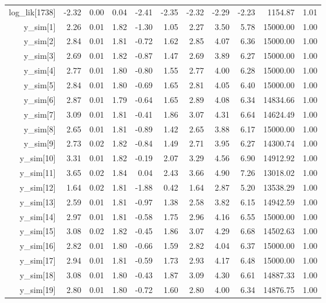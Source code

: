 \begin{table}[ht]
\begin{tabular}{rrrrrrrrrrr}
  log\_lik[1738] & -2.32 & 0.00 & 0.04 & -2.41 & -2.35 & -2.32 & -2.29 & -2.23 & 1154.87 & 1.01 \\ 
  y\_sim[1] & 2.26 & 0.01 & 1.82 & -1.30 & 1.05 & 2.27 & 3.50 & 5.78 & 15000.00 & 1.00 \\ 
  y\_sim[2] & 2.84 & 0.01 & 1.81 & -0.72 & 1.62 & 2.85 & 4.07 & 6.36 & 15000.00 & 1.00 \\ 
  y\_sim[3] & 2.69 & 0.01 & 1.82 & -0.87 & 1.47 & 2.69 & 3.89 & 6.27 & 15000.00 & 1.00 \\ 
  y\_sim[4] & 2.77 & 0.01 & 1.80 & -0.80 & 1.55 & 2.77 & 4.00 & 6.28 & 15000.00 & 1.00 \\ 
  y\_sim[5] & 2.84 & 0.01 & 1.80 & -0.69 & 1.65 & 2.81 & 4.05 & 6.40 & 15000.00 & 1.00 \\ 
  y\_sim[6] & 2.87 & 0.01 & 1.79 & -0.64 & 1.65 & 2.89 & 4.08 & 6.34 & 14834.66 & 1.00 \\ 
  y\_sim[7] & 3.09 & 0.01 & 1.81 & -0.41 & 1.86 & 3.07 & 4.31 & 6.64 & 14624.49 & 1.00 \\ 
  y\_sim[8] & 2.65 & 0.01 & 1.81 & -0.89 & 1.42 & 2.65 & 3.88 & 6.17 & 15000.00 & 1.00 \\ 
  y\_sim[9] & 2.73 & 0.02 & 1.82 & -0.84 & 1.49 & 2.71 & 3.95 & 6.27 & 14300.74 & 1.00 \\ 
  y\_sim[10] & 3.31 & 0.01 & 1.82 & -0.19 & 2.07 & 3.29 & 4.56 & 6.90 & 14912.92 & 1.00 \\ 
  y\_sim[11] & 3.65 & 0.02 & 1.84 & 0.04 & 2.43 & 3.66 & 4.90 & 7.26 & 13018.02 & 1.00 \\ 
  y\_sim[12] & 1.64 & 0.02 & 1.81 & -1.88 & 0.42 & 1.64 & 2.87 & 5.20 & 13538.29 & 1.00 \\ 
  y\_sim[13] & 2.59 & 0.01 & 1.81 & -0.97 & 1.38 & 2.58 & 3.82 & 6.15 & 14942.59 & 1.00 \\ 
  y\_sim[14] & 2.97 & 0.01 & 1.81 & -0.58 & 1.75 & 2.96 & 4.16 & 6.55 & 15000.00 & 1.00 \\ 
  y\_sim[15] & 3.08 & 0.02 & 1.82 & -0.45 & 1.86 & 3.07 & 4.29 & 6.68 & 14502.63 & 1.00 \\ 
  y\_sim[16] & 2.82 & 0.01 & 1.80 & -0.66 & 1.59 & 2.82 & 4.04 & 6.37 & 15000.00 & 1.00 \\ 
  y\_sim[17] & 2.94 & 0.01 & 1.81 & -0.59 & 1.73 & 2.93 & 4.17 & 6.48 & 15000.00 & 1.00 \\ 
  y\_sim[18] & 3.08 & 0.01 & 1.80 & -0.43 & 1.87 & 3.09 & 4.30 & 6.61 & 14887.33 & 1.00 \\ 
  y\_sim[19] & 2.80 & 0.01 & 1.80 & -0.72 & 1.60 & 2.80 & 4.00 & 6.34 & 14876.75 & 1.00 \\ 

\end{tabular}
\end{table}
